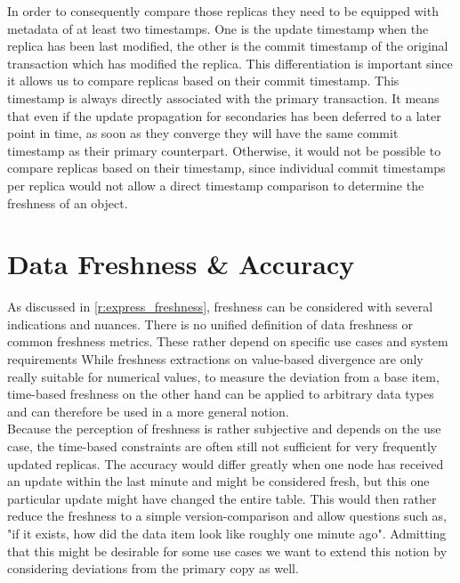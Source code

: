 In order to consequently compare those replicas they need to be equipped with metadata of at least two timestamps. 
One is the update timestamp when the replica has been last modified,
the other is the commit timestamp of the original transaction which has modified the replica.
This differentiation is important since it allows us to compare replicas based on their commit timestamp. This timestamp is always directly associated with the primary transaction.
It means that even if the update propagation for secondaries has been deferred to a later point in time, as soon as they converge they will have the same commit timestamp 
as their primary counterpart.
Otherwise, it would not be possible to compare replicas based on their timestamp, since individual commit timestamps per replica would not allow a direct timestamp comparison 
to determine the freshness of an object.



\section{Data Freshness \& Accuracy}
\label{sec:fresh}

As discussed in \ref{r:express_freshness}, freshness can be considered with several indications and nuances.
There is no unified definition of data freshness or common freshness metrics.
These rather depend on specific use cases and system requirements
While freshness extractions on value-based divergence are only really suitable for numerical values,
to measure the deviation from a base item, time-based freshness on the other hand can be applied to arbitrary data types and can therefore be used 
in a more general notion.\\
Because the perception of freshness is rather subjective and depends on the use case, the time-based constraints are often still not sufficient for very frequently
updated replicas.
The accuracy would differ greatly when one node has received an update within the last minute and might be considered fresh, but this one particular 
update might have changed the entire table. 
This would then rather reduce the freshness to a simple version-comparison and allow questions such as, "if it exists, how did the data item look like roughly one minute ago".
Admitting that this might be desirable for some use cases we want to extend this notion by considering deviations from the primary copy as well.\\

